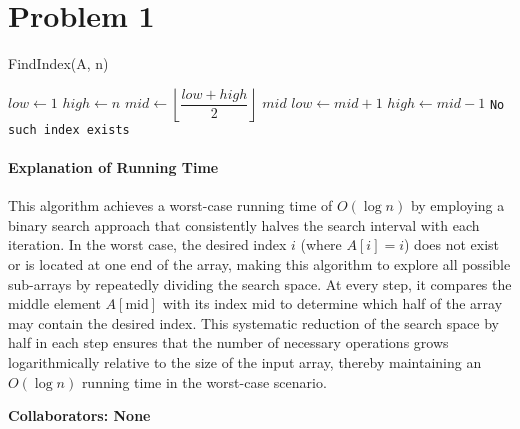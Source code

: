 \documentclass[12 pt]{article}
\begin{document}
\section*{Problem 1}
\begin{algorithm}
\caption{FindIndex(A, n)}
\begin{algorithmic}[1]
    \State $low \gets 1$
    \State $high \gets n$
        \State $mid \gets \left\lfloor \dfrac{low + high}{2} \right\rfloor$
            \State \Return $mid$
            \State $low \gets mid + 1$
        \Else
            \State $high \gets mid - 1$
        \EndIf
    \EndWhile
    \State \Return \texttt{No such index exists}
\EndFunction
\end{algorithmic}
\end{algorithm}

\paragraph{Explanation of Running Time}

This algorithm achieves a worst-case running time of \( O(\log n) \) by employing a binary search approach that consistently halves the search interval with each iteration. In the worst case, the desired index \( i \) (where \( A[i] = i \)) does not exist or is located at one end of the array, making this algorithm to explore all possible sub-arrays by repeatedly dividing the search space. At every step, it compares the middle element \( A[\text{mid}] \) with its index \( \text{mid} \) to determine which half of the array may contain the desired index. This systematic reduction of the search space by half in each step ensures that the number of necessary operations grows logarithmically relative to the size of the input array, thereby maintaining an \( O(\log n) \) running time in the worst-case scenario.



\vspace{1cm}

\noindent\textbf{Collaborators: None}
\end{document}
